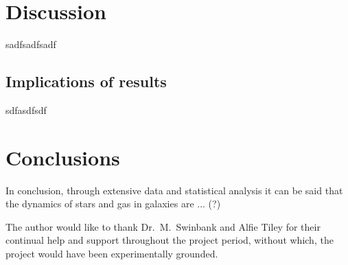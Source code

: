 \documentclass[12pt, twocolumn]{revtex4}    %
\begin{document}
\section{Discussion} 

sadfsadfsadf

\subsection{Implications of results}

sdfasdfsdf

\section{Conclusions}
 
In conclusion, through extensive data and statistical analysis it can be said that the dynamics of stars and gas in galaxies are ... (?) 

\begin{acknowledgments}
The author would like to thank Dr.~M.~Swinbank and Alfie Tiley for their continual help and support throughout the project period, without which, the project would have been experimentally grounded.
\end{acknowledgments}



\end{document}
